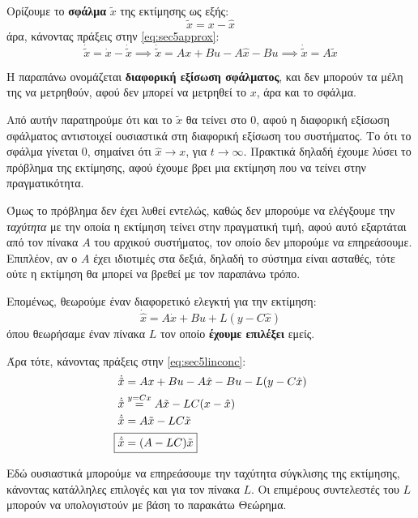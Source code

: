 \documentclass[11pt,a4paper,notitlepage,fleqn]{article}
\let\mytodo\todo
\renewcommand{\todo}[1]{\par\mytodo[inline,noline]{#1}}
\begin{document}
Ορίζουμε το \textbf{σφάλμα} \( \tilde x \) της εκτίμησης ως εξής:
\[
\tilde x = x-\hat x
\]
άρα, κάνοντας πράξεις στην \eqref{eq:sec5approx}:
\[
\dot{\tilde{x}} = \dot x - \dot{\tilde{x}}
\implies \dot{\tilde{x}} = Ax + Bu - A\hat x -Bu
\implies \boxed{\dot{\tilde{x}} = A\tilde x}
\]

Η παραπάνω ονομάζεται \textbf{διαφορική εξίσωση σφάλματος}, και δεν μπορούν
τα μέλη της να μετρηθούν, αφού δεν μπορεί να μετρηθεί το \( x \), άρα
και το σφάλμα.

Από αυτήν παρατηρούμε ότι και το \( \tilde x \) θα τείνει στο 0, αφού
η διαφορική εξίσωση σφάλματος αντιστοιχεί ουσιαστικά στη διαφορική εξίσωση
του συστήματος. Το ότι το σφάλμα γίνεται 0, σημαίνει ότι \( \hat x \to x \), για \( t \to \infty \). Πρακτικά δηλαδή έχουμε λύσει το πρόβλημα της
εκτίμησης, αφού έχουμε βρει μια εκτίμηση που να τείνει στην πραγματικότητα.

Όμως το πρόβλημα δεν έχει λυθεί εντελώς, καθώς δεν μπορούμε να ελέγξουμε την \textit{ταχύτητα} με την οποία η εκτίμηση τείνει στην πραγματική τιμή, αφού αυτό εξαρτάται από τον πίνακα \( A \) του αρχικού συστήματος, τον οποίο δεν μπορούμε να επηρεάσουμε. Επιπλέον, αν ο \( A \) έχει ιδιοτιμές
στα δεξιά, δηλαδή το σύστημα είναι ασταθές, τότε ούτε η εκτίμηση θα
μπορεί να βρεθεί με τον παραπάνω τρόπο.

Επομένως, θεωρούμε έναν διαφορετικό ελεγκτή για την εκτίμηση:
\[
\boxed{\dot{\hat x} = A\dot x + Bu + L(y-C\hat x)}
\]
όπου θεωρήσαμε έναν πίνακα \( L \) τον οποίο \textbf{έχουμε επιλέξει} εμείς.

Άρα τότε, κάνοντας πράξεις στην \eqref{eq:sec5linconc}:
\begin{align*}
	\dot{\tilde x} &= Ax + Bu - A\hat x - Bu - L(y-C\hat x)\\
	\dot{\tilde x} &\overset{y=Cx}{=} A\tilde x - LC(x-\hat x)\\
	\dot{\tilde x}&= A\tilde{x} - LC\tilde x\\
	\Aboxed{
		\dot{\tilde x} &= (A-LC)\tilde x
		}
\end{align*}
\todo{prettify}

Εδώ ουσιαστικά μπορούμε να επηρεάσουμε την ταχύτητα σύγκλισης της εκτίμησης,
κάνοντας κατάλληλες επιλογές και για τον πίνακα \( L \). Οι επιμέρους
συντελεστές του \( L \) μπορούν να υπολογιστούν με βάση το παρακάτω Θεώρημα.
\end{document}
